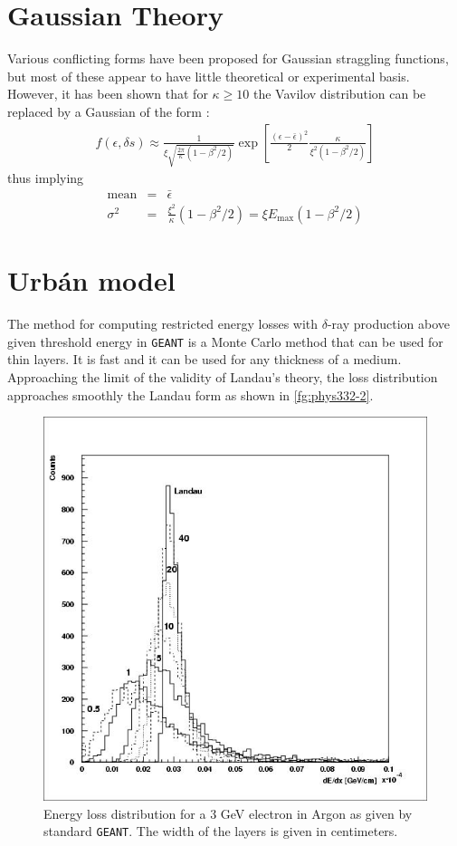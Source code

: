 \documentclass{article}
\newcommand{\Emax}{\ensuremath{E_{\mathrm{max}}}}
\newcommand{\GEANT}{\texttt{GEANT}}
\begin{document}
\section{Gaussian Theory}
 
Various conflicting forms have been proposed for Gaussian straggling
functions, but most of these appear to have little theoretical or
experimental basis.  However, it has been shown\cite{bib-SELT} that
for $\kappa \geq 10 $ the Vavilov distribution can be replaced by a
Gaussian of the form :
\begin{eqnarray*}
f( \epsilon , \delta s)  \approx \frac{1}
{\xi \sqrt{\frac{2 \pi}{\kappa} \left( 1 - \beta^2/2 \right)}}
   \exp \left [ \frac{( \epsilon - \bar{\epsilon} )^2}{2} \frac{\kappa}
   {\xi^2 (1- \beta^2/2)}\right ]
\end{eqnarray*}
thus implying 
\begin{eqnarray*}
\mathrm{mean} & = & \bar{\epsilon} \\
\sigma^2      & = & \frac{\xi^2}{\kappa} (1-\beta^2/2) = \xi
                    \Emax (1-\beta^2/2)
\end{eqnarray*}

\section{Urb\'an model}
\label{urban}

The method for computing restricted energy losses with $\delta$-ray
production above given threshold energy in \GEANT{} is a Monte
Carlo method that can be used for thin layers.  It is fast and it can
be used for any thickness of a medium.  Approaching the limit of the
validity of Landau's theory, the loss distribution approaches smoothly
the Landau form as shown in \autoref{fg:phys332-2}.
\begin{figure}
   \centering
   \includegraphics[width=.6\linewidth]{phys2}
   \caption{Energy loss distribution for a 3 GeV electron in
     Argon as given by standard \GEANT.  The width of the layers is
     given in centimeters.}
    \label{fg:phys332-2}
\end{figure}
\end{document}
